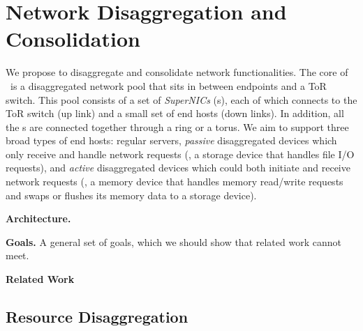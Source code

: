 \fi


\section{Network Disaggregation and Consolidation}

We propose to disaggregate and consolidate network functionalities.
The core of \sysname\ is a disaggregated network pool that sits in between endpoints and a ToR switch.
This pool consists of a set of \textit{SuperNICs} (\textit{\snic}s), each of which connects to the ToR switch (up link) and a small set of end hosts (down links).
In addition, all the \snic{}s are connected together through a ring or a torus.
We aim to support three broad types of end hosts:
regular servers, \textit{passive} disaggregated devices which only receive and handle network requests (\eg, a storage device that handles file I/O requests), 
and \textit{active} disaggregated devices which could both initiate and receive network requests (\eg, a memory device that handles memory read/write requests and swaps or flushes its memory data to a storage device).

\textbf{Architecture.}

\textbf{Goals.} A general set of goals, which we should show
that related work cannot meet.

\textbf{Related Work}


\fi

\subsection{Resource Disaggregation}

